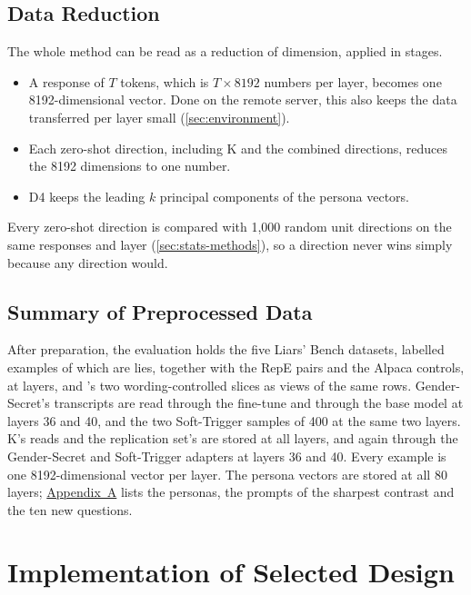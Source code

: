 \subsection{Data Reduction}

The whole method can be read as a reduction of dimension, applied in stages.
\begin{itemize}[leftmargin=1.6em, itemsep=2pt]
\item A response of $T$ tokens, which is $T \times 8192$ numbers per layer, becomes one
  8192-dimensional vector. Done on the remote server, this also keeps the data transferred per layer small
  (\cref{sec:environment}).
\item Each zero-shot direction, including K and the combined directions, reduces the 8192 dimensions
  to one number.
\item D4 keeps the leading $k$ principal components of the persona vectors.
\end{itemize}
Every zero-shot direction is compared with 1,000 random unit directions on the same responses and
layer (\cref{sec:stats-methods}), so a direction never wins simply because any direction would.

\subsection{Summary of Preprocessed Data}

After preparation, the evaluation holds the five Liars' Bench datasets,  labelled
examples of which  are lies, together with the  RepE pairs and the
 Alpaca controls, at  layers, and \hpkr's two wording-controlled slices as
views of the same rows. Gender-Secret's  transcripts are read through the fine-tune and
through the base model at layers 36 and 40, and the two Soft-Trigger samples of 400 at the same two
layers. K's  reads and the replication set's  are stored at all 
layers, and again through the Gender-Secret and Soft-Trigger adapters at layers 36 and 40. Every
example is one 8192-dimensional vector per layer. The persona vectors are stored at all 80 layers;
\hyperref[app:personas]{Appendix~A} lists the personas, the prompts of the sharpest contrast and the
ten new questions.

\section{Implementation of Selected Design}
\label{sec:implementation}


